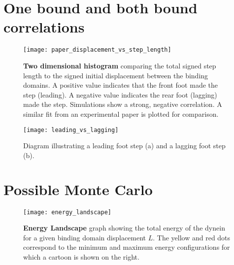 \section{One bound and both bound correlations}
\begin{figure}[!hbt]
	\centering
	\texttt{[image: paper\_displacement\_vs\_step\_length]}
	\caption{\textbf{Two dimensional histogram} comparing the total signed step length to
			the signed initial displacement between the binding domains. A positive value
			indicates that the front foot made the step (leading). A negative value
			indicates the rear foot (lagging) made the step. Simulations show a strong,
			negative correlation. A similar fit from an experimental paper is plotted for comparison.}
	\label{fig:displacement_vs_step_length}
\end{figure}
	
	
\begin{figure}[!hbt]
	\centering
	\texttt{[image: leading\_vs\_lagging]}
	\caption{Diagram illustrating a leading foot step (a) and a lagging foot step (b).}
\end{figure}



\section{Possible Monte Carlo}
\begin{figure}[!hbt]
	\centering
	\texttt{[image: energy\_landscape]}
	\caption{\textbf{Energy Landscape} graph showing the total energy of the dynein for a given binding domain displacement $L$. The yellow and red dots correspond to the minimum and maximum energy configurations for which a cartoon is shown on the right.}
	\label{fig:energy_landscape}
\end{figure}


			

\vspace{10em}
